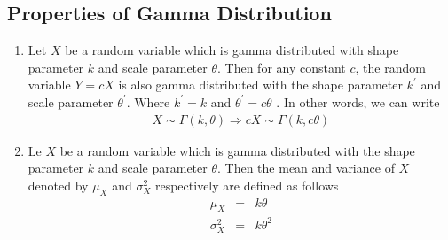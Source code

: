 \subsection{Properties of Gamma Distribution}
\begin{enumerate}
\item Let $X$ be a random variable which is gamma distributed with shape parameter $k$ and scale parameter $\theta$. Then for any constant $c$, the random variable $Y = cX$ is also gamma distributed with the shape parameter $k^{'}$ and scale parameter $\theta^{'}$. Where $k^{'} = k$ and $\theta^{'} = c\theta$ \cite{scaling_of_gamma_distribution_uah}. In other words, we can write
\begin{eqnarray}
X \sim \Gamma(k,\theta) \Rightarrow cX \sim \Gamma(k,c\theta)\label{eqn:gamma_dist_property_scaling}
\end{eqnarray}
\item Le $X$ be a random variable which is gamma distributed with the shape parameter $k$ and scale parameter $\theta$. Then the mean and variance of $X$ denoted by $\mu_X$ and $\sigma^2_X$ respectively are defined as follows \citep{gamma_distribution_book}
\begin{eqnarray}
\mu_X &=& k \theta  \label{eqn:mean_gamma_dist} \\
\sigma^2_X &=& k \theta^2 \label{eqn:variance_gamma_dist}
\end{eqnarray}

\end{enumerate}
